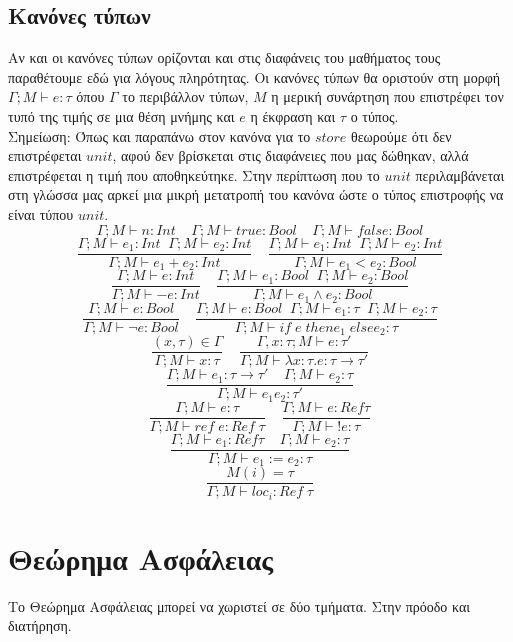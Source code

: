 \documentclass[a4paper]{article}
\begin{document}
\subsection*{Κανόνες τύπων}
Αν και οι κανόνες τύπων ορίζονται και στις διαφάνεις του μαθήματος τους παραθέτουμε εδώ για λόγους πληρότητας. Οι κανόνες τύπων θα οριστούν στη μορφή \(\Gamma ; M \vdash e : \tau\) όπου \(\Gamma\) το περιβάλλον τύπων, \(M\) η μερική συνάρτηση που επιστρέφει τον τυπό της τιμής σε μια θέση μνήμης και \(e\) η έκφραση και \(\tau\) ο τύπος. \\
Σημείωση: Όπως και παραπάνω στον κανόνα για το \(store\) θεωρούμε ότι δεν επιστρέφεται \(unit\), αφού δεν βρίσκεται στις διαφάνειες που μας δώθηκαν, αλλά επιστρέφεται η τιμή που αποθηκεύτηκε. Στην περίπτωση που το \(unit\) περιλαμβάνεται στη γλώσσα μας αρκεί μια μικρή μετατροπή του κανόνα ώστε ο τύπος επιστροφής να είναι τύπου \(unit\). 
\[\Gamma ; M \vdash n : Int \; \; \; \; \Gamma ; M \vdash  true : Bool \; \; \; \; \Gamma ; M \vdash false : Bool\]
\[\frac{\Gamma ; M \vdash e_1 : Int \; \; \Gamma ; M \vdash e_2 : Int}{\Gamma ; M \vdash e_1 + e_2 : Int} \; \; \; \; \frac{\Gamma ; M \vdash e_1 : Int \; \; \Gamma ; M \vdash e_2 : Int}{\Gamma ; M \vdash e_1 < e_2 : Bool}\]
\[\frac{\Gamma ; M \vdash e : Int}{\Gamma ; M \vdash - e : Int} \; \; \; \; \frac{\Gamma ; M \vdash e_1 : Bool \; \; \Gamma ; M \vdash e_2 : Bool}{\Gamma ; M \vdash e_1 \wedge e_2 : Bool}\]
\[\frac{\Gamma ; M \vdash e : Bool}{\Gamma ; M \vdash \neg e : Bool} \; \; \; \; \frac{\Gamma ; M \vdash e : Bool \; \; \Gamma ; M \vdash e_1 : \tau \; \; \Gamma ; M \vdash e_2 : \tau}{\Gamma ; M \vdash if \; e \; then e_1 \; else e_2 : \tau}\]
\[\frac{(x, \tau) \in \Gamma}{\Gamma ; M \vdash x : \tau} \; \; \; \; \frac{\Gamma , x: \tau ; M \vdash e : \tau' }{\Gamma ; M \vdash \lambda x : \tau . e : \tau \rightarrow \tau'}\]
\[\frac{\Gamma ; M \vdash e_1 : \tau \rightarrow \tau' \; \; \; \; \Gamma ; M \vdash e_2 : \tau}{\Gamma ; M \vdash  e_1 e_2 : \tau'}\]
\[\frac{\Gamma ; M \vdash e : \tau}{\Gamma ; M \vdash ref \; e : Ref \; \tau} \; \; \; \; \frac{\Gamma ; M \vdash e : Ref \tau}{\Gamma ; M \vdash !e : \tau}\]
\[\frac{\Gamma ; M \vdash e_1 : Ref \tau \; \; \; \; \Gamma ; M \vdash e_2 : \tau}{\Gamma ; M \vdash e_1 := e_2 : \tau}\]
\[\frac{M(i) = \tau}{\Gamma ; M \vdash loc_i : Ref \; \tau}\]

\section*{Θεώρημα Ασφάλειας} 
Το Θεώρημα Ασφάλειας μπορεί να χωριστεί σε δύο τμήματα. Στην πρόοδο και διατήρηση.
\end{document}
